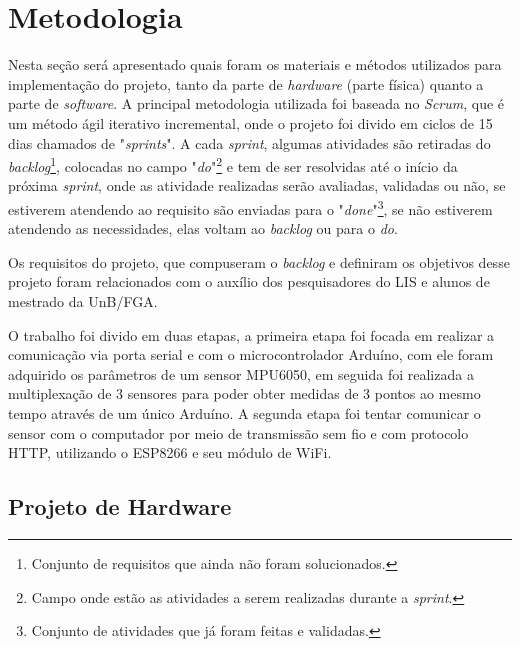 \chapter[Metodologia]{Metodologia}

Nesta seção será apresentado quais foram os materiais e métodos utilizados para implementação do projeto, tanto da parte de \textit{hardware} (parte física) quanto a parte de \textit{software}. A principal metodologia utilizada foi baseada  no \textit{Scrum}, que é um método ágil iterativo incremental, onde o projeto foi divido em ciclos de 15 dias chamados de "\textit{sprints}". A cada \textit{sprint}, algumas atividades são retiradas do \textit{backlog}\footnote{Conjunto de requisitos que ainda não foram solucionados.}, colocadas no campo "\textit{do}"\footnote{Campo onde estão as atividades a serem realizadas durante a \textit{sprint}.}  e tem de ser resolvidas até o início da próxima \textit{sprint}, onde as atividade realizadas serão avaliadas,  validadas ou não, se estiverem atendendo ao requisito são enviadas para o "\textit{done}"\footnote{Conjunto de atividades que já foram feitas e validadas.}, se não estiverem atendendo as necessidades, elas voltam ao \textit{backlog} ou para o \textit{do}.

Os requisitos do projeto, que compuseram o \textit{backlog} e definiram os objetivos desse projeto foram relacionados com o auxílio dos pesquisadores do LIS e alunos de mestrado da UnB/FGA.

O trabalho foi divido em duas etapas, a primeira etapa foi focada em realizar a comunicação via porta serial  e com o microcontrolador Arduíno, com ele foram adquirido os parâmetros de um sensor MPU6050, em seguida foi realizada a multiplexação de 3 sensores para poder obter medidas de 3 pontos ao mesmo tempo através de um único Arduíno. A segunda etapa foi tentar comunicar o sensor com o computador por meio de transmissão sem fio e com protocolo HTTP, utilizando o ESP8266 e seu módulo de WiFi.
   
\section{Projeto de Hardware}

